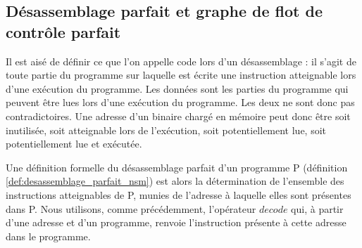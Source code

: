 


\subsection{Désassemblage parfait et graphe de flot de contrôle parfait}
Il est aisé de définir ce que l'on appelle code lors d'un désassemblage : il s'agit de toute partie du programme sur laquelle est écrite une instruction atteignable lors d'une exécution du programme.
Les données sont les parties du programme qui peuvent être lues lors d'une exécution du programme. 
Les deux ne sont donc pas contradictoires.
Une adresse d'un binaire chargé en mémoire peut donc être soit inutilisée, soit atteignable lors de l'exécution, soit potentiellement lue, soit potentiellement lue et exécutée.

\begin{center}
\end{center}

Une définition formelle du désassemblage parfait d'un programme P (définition \ref{def:desassemblage_parfait_nsm}) est alors la détermination de l'ensemble des instructions atteignables de P, munies de l'adresse à laquelle elles sont présentes dans P.
Nous utilisons, comme précédemment, l'opérateur $decode$ qui, à partir d'une adresse et d'un programme, renvoie l'instruction présente à cette adresse dans le programme.

